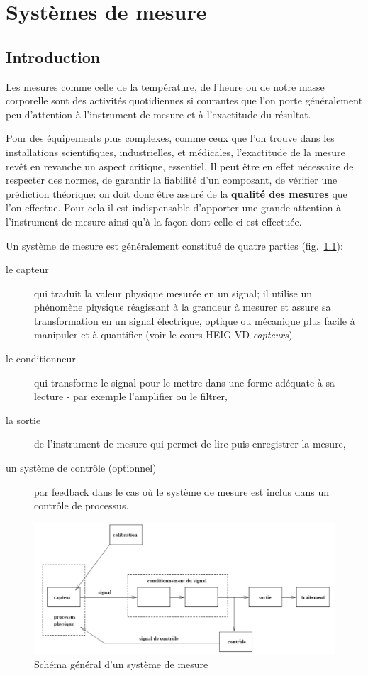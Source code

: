 \chapter{Systèmes de mesure}

\section{Introduction}

Les mesures comme celle de la température, de l'heure ou de notre masse corporelle sont des activités quotidiennes si courantes que l'on porte généralement peu d'attention à l'instrument de mesure et à l'exactitude du résultat.

Pour des équipements plus complexes, comme ceux que l'on trouve dans les installations scientifiques, industrielles, et médicales, l'exactitude de la mesure revêt en revanche un aspect critique, essentiel. Il peut être en effet nécessaire de respecter des normes, de garantir la fiabilité d'un composant, de vérifier une prédiction théorique: on doit donc être assuré de la \textbf{qualité des mesures} que l'on effectue. Pour cela il est indispensable d'apporter une grande attention à l'instrument de mesure ainsi qu'à la façon dont celle-ci est effectuée.

Un système de mesure est généralement constitué de quatre parties (fig.~\ref{fig:sysmes}):
\begin{description}
\item[le capteur] qui traduit la valeur physique mesurée en un signal; il utilise un phénomène physique réagissant à la grandeur à mesurer et assure sa transformation en un signal électrique, optique ou mécanique plus facile à manipuler et à quantifier (voir le cours HEIG-VD \textit{capteurs}).
\item[le conditionneur] qui transforme le signal pour le mettre dans une forme adéquate à sa lecture - par exemple l'amplifier ou le filtrer,
\item[la sortie] de l'instrument de mesure qui permet de lire puis enregistrer la mesure,
\item[un système de contrôle (optionnel)] par feedback dans le cas où le système de mesure est inclus dans un contrôle de processus.
\end{description}
\begin{figure}
   \centering
   \includegraphics[width=20cm]{assets/figures/systemeMesure.pdf}
   \caption{Schéma général d'un système de mesure}
   \label{fig:sysmes}
\end{figure}

